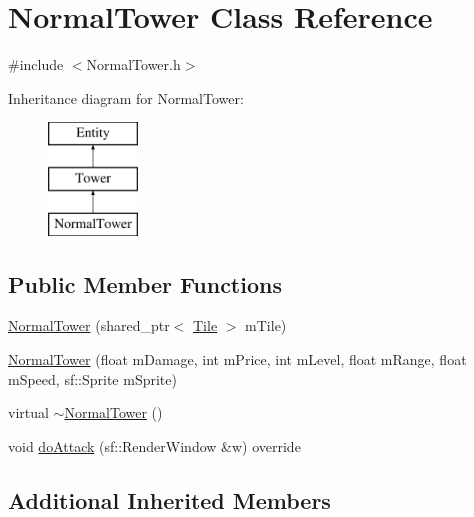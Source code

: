 \hypertarget{class_normal_tower}{\section{Normal\+Tower Class Reference}
\label{class_normal_tower}
}


{\ttfamily \#include $<$Normal\+Tower.\+h$>$}

Inheritance diagram for Normal\+Tower\+:\begin{figure}[H]
\begin{center}
\leavevmode
\includegraphics[height=3.000000cm]{class_normal_tower}
\end{center}
\end{figure}
\subsection*{Public Member Functions}
\begin{DoxyCompactItemize}
\item 
\hyperlink{class_normal_tower_a99db5d3dbf58cd6ba3619d4e4601630c}{Normal\+Tower} (shared\+\_\+ptr$<$ \hyperlink{class_tile}{Tile} $>$ m\+Tile)
\item 
\hyperlink{class_normal_tower_a9f7b920d45d9b3388d0039ecf5febbd3}{Normal\+Tower} (float m\+Damage, int m\+Price, int m\+Level, float m\+Range, float m\+Speed, sf\+::\+Sprite m\+Sprite)
\item 
virtual \hyperlink{class_normal_tower_a26761e67765db3cdb854c695d17b7bc5}{$\sim$\+Normal\+Tower} ()
\item 
void \hyperlink{class_normal_tower_a1e3b0a2216d943650b060bac297511b6}{do\+Attack} (sf\+::\+Render\+Window \&w) override
\end{DoxyCompactItemize}
\subsection*{Additional Inherited Members}


